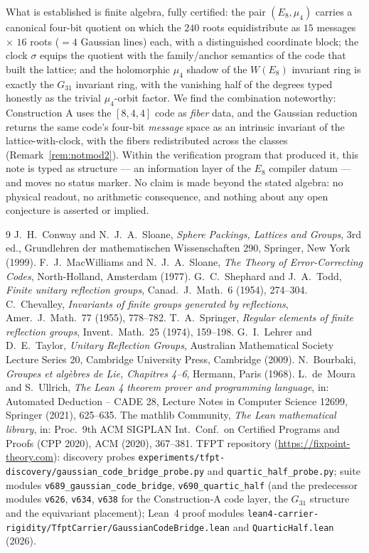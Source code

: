 What is established is finite algebra, fully certified: the pair
$(E_8,\mu_4)$ carries a canonical four-bit quotient on which the
$240$ roots equidistribute as $15$ messages $\times$ $16$ roots
(${}=4$ Gaussian lines) each, with a distinguished coordinate block;
the clock $\sigma$ equips the quotient with the family/anchor
semantics of the code that built the lattice; and the holomorphic
$\mu_4$ shadow of the $W(E_8)$ invariant ring is exactly the
$G_{31}$ invariant ring, with the vanishing half of the degrees typed
honestly as the trivial $\mu_4$-orbit factor.  We find the
combination noteworthy: Construction A uses the $[8,4,4]$ code as
\emph{fiber} data, and the Gaussian reduction returns the same code's
four-bit \emph{message} space as an intrinsic invariant of the
lattice-with-clock, with the fibers redistributed across the classes
(Remark~\ref{rem:notmod2}).  Within the verification program that
produced it, this note is typed as structure --- an information layer
of the $E_8$ compiler datum --- and moves no status marker.  No claim
is made beyond the stated algebra: no physical readout, no arithmetic
consequence, and nothing about any open conjecture is asserted or
implied.

\small
\begin{thebibliography}{9}
 J.~H.~Conway and N.~J.~A.~Sloane,
\emph{Sphere Packings, Lattices and Groups}, 3rd ed.,
Grundlehren der mathematischen Wissenschaften 290, Springer, New York
(1999).
 F.~J.~MacWilliams and N.~J.~A.~Sloane,
\emph{The Theory of Error-Correcting Codes}, North-Holland,
Amsterdam (1977).
 G.~C.~Shephard and J.~A.~Todd,
\emph{Finite unitary reflection groups},
Canad.\ J.\ Math.\ 6 (1954), 274--304.
 C.~Chevalley,
\emph{Invariants of finite groups generated by reflections},
Amer.\ J.\ Math.\ 77 (1955), 778--782.
 T.~A.~Springer,
\emph{Regular elements of finite reflection groups},
Invent.\ Math.\ 25 (1974), 159--198.
 G.~I.~Lehrer and D.~E.~Taylor,
\emph{Unitary Reflection Groups}, Australian Mathematical Society
Lecture Series 20, Cambridge University Press, Cambridge (2009).
 N.~Bourbaki,
\emph{Groupes et alg\`ebres de Lie, Chapitres 4--6},
Hermann, Paris (1968).
 L.~de~Moura and S.~Ullrich,
\emph{The Lean 4 theorem prover and programming language},
in: Automated Deduction -- CADE 28, Lecture Notes in Computer
Science 12699, Springer (2021), 625--635.
 The mathlib Community,
\emph{The Lean mathematical library},
in: Proc.\ 9th ACM SIGPLAN Int.\ Conf.\ on Certified Programs and
Proofs (CPP 2020), ACM (2020), 367--381.
 TFPT repository
(\url{https://fixpoint-theory.com}): discovery probes
\texttt{experiments/tfpt-discovery/gaussian\_code\_bridge\_probe.py}
and \texttt{quartic\_half\_probe.py}; suite modules
\texttt{v689\_gaussian\_code\_bridge},
\texttt{v690\_quartic\_half} (and the predecessor modules
\texttt{v626}, \texttt{v634}, \texttt{v638} for the Construction-A
code layer, the $G_{31}$ structure and the equivariant placement);
Lean~4 proof modules
\texttt{lean4-carrier-rigidity/TfptCarrier/GaussianCodeBridge.lean}
and \texttt{QuarticHalf.lean} (2026).
\end{thebibliography}


